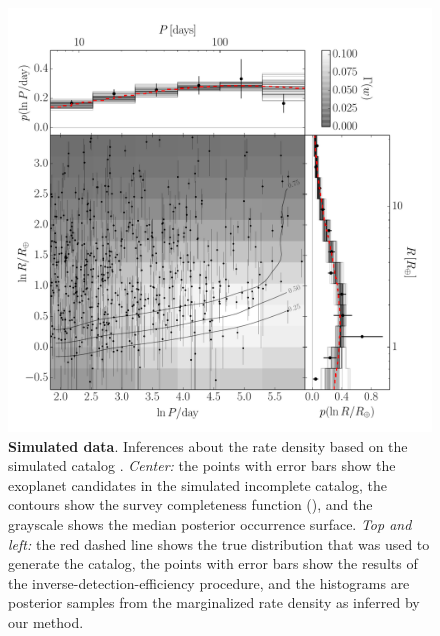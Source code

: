 \begin{figure}[p]
\begin{center}
\includegraphics[width=\textwidth]{figures/exopop/smooth/results.pdf}
\end{center}
\caption[The inferred planet population for the simulated catalog \modela]{%
{\bf Simulated data}.
Inferences about the rate density based on the simulated catalog \modela.
\emph{Center:} the points with error bars show the exoplanet candidates in the
simulated incomplete catalog, the contours show the survey completeness
function (\citealt{Petigura:2013}), and the grayscale shows the median posterior
occurrence surface.
\emph{Top and left:} the red dashed line shows the true distribution that was
used to generate the catalog, the points with error bars show the results of
the inverse-detection-efficiency procedure, and the histograms are posterior
samples from the marginalized rate density as inferred by our method.
}
\end{figure}

